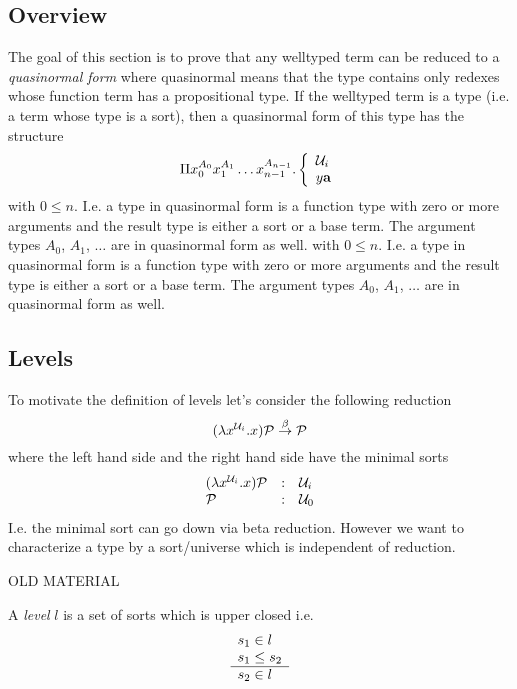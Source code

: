 \subsection{Overview}

The goal of this section is to prove that any welltyped term can be reduced to a
\emph{quasinormal form} where quasinormal means that the type contains only
redexes whose function term has a propositional type. If the welltyped term is a
type (i.e. a term whose type is a sort), then a quasinormal form of this type
has the structure
$$
    \Pi
    x_0^{A_0} x_1^{A_1} \ldots x_{n-1}^{A_{n-1}}
    .
    \left\{
        \begin{array}{l}
            {\cal U}_i
            \\
            y {\mathbf a}
        \end{array}
    \right .
$$
with $0 \le n$. I.e. a type in quasinormal form is a function type with zero or
more arguments and the result type is either a sort or a base term. The argument
types $A_0$, $A_1$, $\ldots$ are in quasinormal form as well.
with $0 \le n$. I.e. a type in quasinormal form is a function type with zero or
more arguments and the result type is either a sort or a base term. The argument
types $A_0$, $A_1$, $\ldots$ are in quasinormal form as well.






\subsection{Levels}

To motivate the definition of levels let's consider the following reduction
$$
    (\lambda x^{{\cal U}_i}. x) {\cal P} \stackrel{\beta}{\to} {\cal P}
$$
where the left hand side and the right hand side have the minimal sorts
$$
    \begin{array}{lll}
        (\lambda x^{{\cal U}_i} . x) {\cal P} &:& {\cal U}_i
        \\
        {\cal P} &:& {\cal U}_0
    \end{array}
$$
I.e. the minimal sort can go down via beta reduction. However we want to
characterize a type by a sort/universe which is independent of reduction.




\noindent OLD MATERIAL

\begin{definition}
    A \emph{level} $l$ is a set of sorts which is upper closed i.e.
    $$
    \begin{array}{l} s_1 \in l \\ s_1 \le s_2 \\ \hline s_2 \in l\end{array}
    $$
\end{definition}


